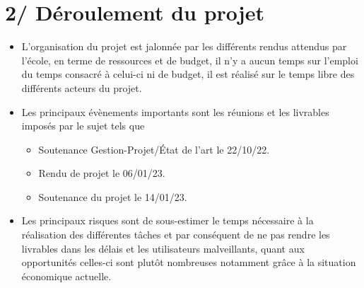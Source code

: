 \documentclass{report}
\begin{document}
\section*{2/ Déroulement du projet}
\begin{itemize}
    \item L'organisation du projet est jalonnée par les différents rendus attendus par l'école, en terme de ressources et de budget, il n'y a aucun temps sur l'emploi du temps consacré à celui-ci ni de budget, il est réalisé sur le temps libre des différents acteurs du projet.
    \item Les principaux évènements importants sont les réunions et les livrables imposés par le sujet tels que 
        \begin{itemize}
        \item Soutenance Gestion-Projet/État de l'art le 22/10/22.
        \item Rendu de projet le 06/01/23.
        \item Soutenance du projet le 14/01/23.
    \end{itemize}
    \item Les principaux risques sont de sous-estimer le temps nécessaire à la réalisation des différentes tâches et par conséquent de ne pas rendre les livrables dans les délais et les utilisateurs malveillants, quant aux opportunités celles-ci sont plutôt nombreuses notamment grâce à la situation économique actuelle.
\end{itemize}

\newpage








\begin{center}
    \textbf{\color{orange}{\Huge Cadrage}} \\
\end{center}   
\end{document}
